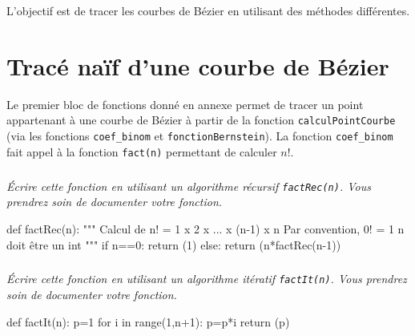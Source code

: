 \documentclass[10pt,fleqn]{article} %
\begin{document}
\begin{obj}
L'objectif est de tracer les courbes de Bézier en utilisant des méthodes différentes.
\end{obj}
\fi

\section{Tracé naïf d'une courbe de Bézier}
\ifprof
\else
Le premier bloc de fonctions donné en annexe permet de tracer un point appartenant à une courbe de Bézier à partir de la fonction \texttt{calculPointCourbe} (via les fonctions \texttt{coef\_binom} et \texttt{fonctionBernstein}). La fonction  \texttt{coef\_binom} fait appel à la fonction \texttt{fact(n)} permettant de calculer $n!$. 
\fi

\subparagraph{}
\textit{Écrire cette fonction en utilisant un algorithme récursif \texttt{factRec(n)}. Vous prendrez soin de documenter votre fonction.}
\ifprof
\begin{corrige}
\begin{py}
\begin{python}
def factRec(n):
		"""
    Calcul de n! = 1 x 2 x ... x (n-1) x n
    Par convention, 0! = 1
    n doit être un int
    """
    if n==0:
        return (1)
    else:
        return (n*factRec(n-1))
\end{python}
\end{py}
\end{corrige}
\else
\fi
\subparagraph{}
\textit{Écrire cette fonction en utilisant un algorithme itératif \texttt{factIt(n)}. Vous prendrez soin de documenter votre fonction.}
\ifprof
\begin{corrige}
\begin{py}
\begin{python}
def factIt(n):
    p=1
    for i in range(1,n+1):
        p=p*i
    return (p)
\end{python}
\end{py}
\end{corrige}
\else
\fi
\end{document}
